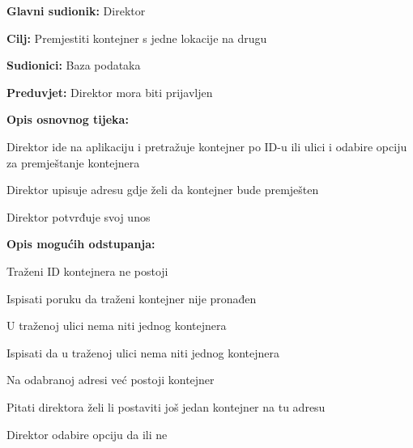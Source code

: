 			\noindent {}
			\begin{packed_item}
				
				\item \textbf{Glavni sudionik: } Direktor
				\item  \textbf{Cilj:} Premjestiti kontejner s jedne lokacije na drugu
				\item  \textbf{Sudionici:} Baza podataka
				\item  \textbf{Preduvjet:} Direktor mora biti prijavljen
				\item  \textbf{Opis osnovnog tijeka:}
				
				\item[] \begin{packed_enum}
					
					\item Direktor ide na aplikaciju i pretražuje kontejner po ID-u ili ulici i odabire opciju za premještanje kontejnera
					\item Direktor upisuje adresu gdje želi da kontejner bude premješten
					\item Direktor potvrđuje svoj unos
				\end{packed_enum}
				
				\item  \textbf{Opis mogućih odstupanja:}
				
				\item[] \begin{packed_item}
					
					\item[2.a] Traženi ID kontejnera ne postoji
					\item[] \begin{packed_enum}
						
						\item Ispisati poruku da traženi kontejner nije pronađen
						
					\end{packed_enum}
					\item[2.b] U traženoj ulici nema niti jednog kontejnera
					\item[] \begin{packed_enum}
						
						\item Ispisati da u traženoj ulici nema niti jednog kontejnera
					\end{packed_enum}
					\item[2.c] Na odabranoj adresi već postoji kontejner
					
					\item[] \begin{packed_enum}
						
						\item Pitati direktora želi li postaviti još jedan kontejner na tu adresu
						\item Direktor odabire opciju da ili ne
						
					\end{packed_enum}
					
					
				\end{packed_item}
			\end{packed_item}
			
